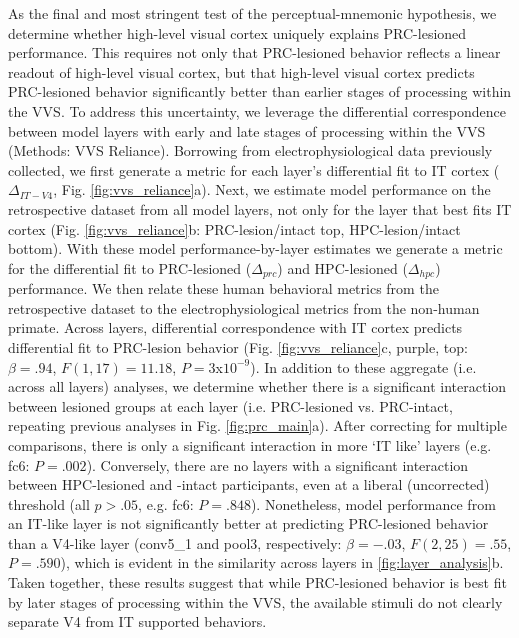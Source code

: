 \documentclass[11pt]{article}
\begin{document}
As the final and most stringent test of the perceptual-mnemonic hypothesis, we determine whether high-level visual cortex uniquely explains PRC-lesioned performance. This requires not only that PRC-lesioned behavior reflects a linear readout of high-level visual cortex, but that high-level visual cortex predicts PRC-lesioned behavior significantly better than earlier stages of processing within the VVS. To address this uncertainty, we leverage the differential correspondence between model layers with early and late stages of processing within the VVS (Methods: VVS Reliance). Borrowing from electrophysiological data previously collected\cite{majaj2015simple}, we first generate a metric for each layer's differential fit to IT cortex ($\Delta_{IT-V4}$, Fig. \ref{fig:vvs_reliance}a). Next, we estimate model performance on the retrospective dataset from all model layers, not only for the layer that best fits IT cortex (Fig. \ref{fig:vvs_reliance}b: PRC-lesion/intact top, HPC-lesion/intact bottom). With these model performance-by-layer estimates we generate a metric for the differential fit to PRC-lesioned ($\Delta_{prc}$) and HPC-lesioned ($\Delta_{hpc}$) performance. We then relate these human behavioral metrics from the retrospective dataset to the electrophysiological metrics from the non-human primate. Across layers, differential correspondence with IT cortex predicts differential fit to PRC-lesion behavior (Fig. \ref{fig:vvs_reliance}c, purple, top: $\beta = .94$, $F(1, 17) = 11.18$, $P = 3$x$ 10^{-9}$). In addition to these aggregate (i.e. across all layers) analyses, we determine whether there is a significant interaction between lesioned groups at each layer (i.e. PRC-lesioned vs. PRC-intact, repeating previous analyses in Fig. \ref{fig:prc_main}a). After correcting for multiple comparisons, there is only a significant interaction in more `IT like' layers (e.g. fc6: $P = .002$). Conversely, there are no layers with a significant interaction between HPC-lesioned and -intact participants, even at a liberal (uncorrected) threshold (all $p > .05$, e.g. fc6: $P = .848$). Nonetheless, model performance from an IT-like layer is not significantly better at predicting PRC-lesioned behavior than a V4-like layer (conv5\_1 and pool3, respectively: $\beta = -.03$,  $F(2, 25) = .55$, $P = .590$), which is evident in the similarity across layers in \ref{fig:layer_analysis}b. Taken together, these results suggest that while PRC-lesioned behavior is best fit by later stages of processing within the VVS, the available stimuli do not clearly separate V4 from IT supported behaviors. 
\end{document}
